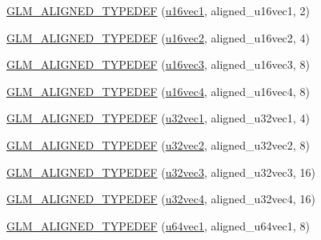 \begin{DoxyCompactItemize}
\item 
\hyperlink{group__gtx__type__aligned_ga991abe990c16de26b2129d6bc2f4c051}{G\+L\+M\+\_\+\+A\+L\+I\+G\+N\+E\+D\+\_\+\+T\+Y\+P\+E\+D\+E\+F} (\hyperlink{group__gtc__type__precision_ga809cb55e5fed3456686aae96e7e8684c}{u16vec1}, aligned\+\_\+u16vec1, 2)
\item 
\hyperlink{group__gtx__type__aligned_gac01bb9fc32a1cd76c2b80d030f71df4c}{G\+L\+M\+\_\+\+A\+L\+I\+G\+N\+E\+D\+\_\+\+T\+Y\+P\+E\+D\+E\+F} (\hyperlink{group__gtc__type__precision_ga10e8900b9610f930772aa55aee8e3121}{u16vec2}, aligned\+\_\+u16vec2, 4)
\item 
\hyperlink{group__gtx__type__aligned_ga09540dbca093793a36a8997e0d4bee77}{G\+L\+M\+\_\+\+A\+L\+I\+G\+N\+E\+D\+\_\+\+T\+Y\+P\+E\+D\+E\+F} (\hyperlink{group__gtc__type__precision_ga947d0d003e016eaf2038d6843b427257}{u16vec3}, aligned\+\_\+u16vec3, 8)
\item 
\hyperlink{group__gtx__type__aligned_gaecafb5996f5a44f57e34d29c8670741e}{G\+L\+M\+\_\+\+A\+L\+I\+G\+N\+E\+D\+\_\+\+T\+Y\+P\+E\+D\+E\+F} (\hyperlink{group__gtc__type__precision_ga87d1f39c523b4d6d4de0c2778afe5474}{u16vec4}, aligned\+\_\+u16vec4, 8)
\item 
\hyperlink{group__gtx__type__aligned_gac6b161a04d2f8408fe1c9d857e8daac0}{G\+L\+M\+\_\+\+A\+L\+I\+G\+N\+E\+D\+\_\+\+T\+Y\+P\+E\+D\+E\+F} (\hyperlink{group__gtc__type__precision_ga09dd72852808c32ba398674736b9672a}{u32vec1}, aligned\+\_\+u32vec1, 4)
\item 
\hyperlink{group__gtx__type__aligned_ga1fa0dfc8feb0fa17dab2acd43e05342b}{G\+L\+M\+\_\+\+A\+L\+I\+G\+N\+E\+D\+\_\+\+T\+Y\+P\+E\+D\+E\+F} (\hyperlink{group__gtc__type__precision_gad3a81c0d5a6941bb9ffdc9fa8611b426}{u32vec2}, aligned\+\_\+u32vec2, 8)
\item 
\hyperlink{group__gtx__type__aligned_ga0019500abbfa9c66eff61ca75eaaed94}{G\+L\+M\+\_\+\+A\+L\+I\+G\+N\+E\+D\+\_\+\+T\+Y\+P\+E\+D\+E\+F} (\hyperlink{group__gtc__type__precision_ga16b26751ba6b83c8a0226b9834d73fdc}{u32vec3}, aligned\+\_\+u32vec3, 16)
\item 
\hyperlink{group__gtx__type__aligned_ga14fd29d01dae7b08a04e9facbcc18824}{G\+L\+M\+\_\+\+A\+L\+I\+G\+N\+E\+D\+\_\+\+T\+Y\+P\+E\+D\+E\+F} (\hyperlink{group__gtc__type__precision_ga6e966cda0025699449a36b41f1787927}{u32vec4}, aligned\+\_\+u32vec4, 16)
\item 
\hyperlink{group__gtx__type__aligned_gab253845f534a67136f9619843cade903}{G\+L\+M\+\_\+\+A\+L\+I\+G\+N\+E\+D\+\_\+\+T\+Y\+P\+E\+D\+E\+F} (\hyperlink{group__gtc__type__precision_gaf0a59fdb715cf4ddf0c4dabf0e2286a9}{u64vec1}, aligned\+\_\+u64vec1, 8)

\end{DoxyCompactItemize}
